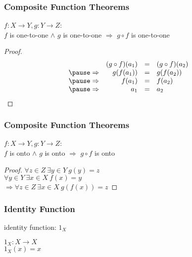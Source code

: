 \documentclass[dvipsnames]{beamer}
\begin{document}
\begin{frame}
  \frametitle{Composite Function Theorems}

  \begin{theorem}
    $f: X \rightarrow Y, g: Y \rightarrow Z$:\\
    $f$ is one-to-one $\wedge$ $g$ is one-to-one $\Rightarrow$ $g \circ f$ is one-to-one
  \end{theorem}

  \pause
  \begin{proof}
    \[
      \begin{array}{crcl}
                  & (g \circ f) (a_1) & = & (g \circ f) (a_2)\\\pause
      \Rightarrow & g(f(a_1))         & = & g(f(a_2))\\\pause
      \Rightarrow & f(a_1)            & = & f(a_2)\\\pause
      \Rightarrow & a_1               & = & a_2
      \end{array}
    \]
  \end{proof}
\end{frame}

\begin{frame}
  \frametitle{Composite Function Theorems}

  \begin{theorem}
    $f: X \rightarrow Y, g: Y \rightarrow Z$:\\
    $f$ is onto $\wedge$ $g$ is onto $\Rightarrow$ $g \circ f$ is onto
  \end{theorem}

  \pause
  \begin{proof}
    $\forall z \in Z~\exists y \in Y~g(y) = z$\\\pause
    $\forall y \in Y~\exists x \in X~f(x) = y$\\\pause
      $\Rightarrow \forall z \in Z~\exists x \in X~g(f(x)) = z$
  \end{proof}
\end{frame}

\begin{frame}
  \frametitle{Identity Function}

  \begin{definition}
    \alert{identity function}: $1_X$

    \medskip
    $1_X: X \rightarrow X$\\
    $1_X(x) = x$
  \end{definition}
\end{frame}
\end{document}
